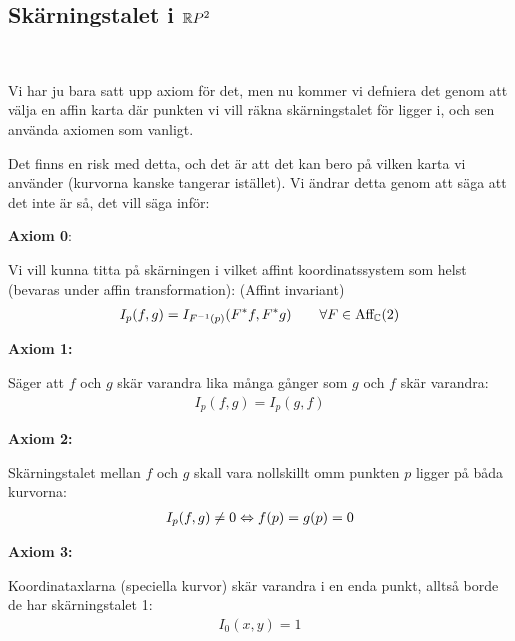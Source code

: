 \subsection{Skärningstalet i $\mathbb{R} P^2$}\hfill\\\par
\noindent Vi har ju bara satt upp axiom för det, men nu kommer vi defniera det genom att välja en affin karta där punkten vi vill räkna skärningstalet för ligger i, och sen använda axiomen som vanligt.\par
\noindent Det finns en risk med detta, och det är att det kan bero på vilken karta vi använder (kurvorna kanske tangerar istället). Vi ändrar detta genom att säga att det inte är så, det vill säga inför:
\par\bigskip
\noindent\textbf{Axiom 0}:\par
\noindent Vi vill kunna titta på skärningen i vilket affint koordinatssystem som helst (bevaras under affin transformation): (Affint invariant)
\begin{equation*}
  \begin{gathered}
    I_p(f,g) = I_{F^{-1}(p)}(F^*f,F^*g)\qquad\forall F\in\text{Aff}_{\mathbb{C}}(2)
  \end{gathered}
\end{equation*}
\par\bigskip
\noindent\textbf{Axiom 1:}\par
\noindent Säger att $f$ och $g$ skär varandra lika många gånger som $g$ och $f$ skär varandra:
\begin{equation*}
  \begin{gathered}
    I_p(f,g) = I_p(g,f)
  \end{gathered}
\end{equation*}
\par\bigskip
\noindent\textbf{Axiom 2:}\par
\noindent Skärningstalet mellan $f$ och $g$ skall vara nollskillt omm punkten $p$ ligger på båda kurvorna:
\begin{equation*}
  \begin{gathered}
    I_p(f,g)\neq0\Leftrightarrow f(p) = g(p) = 0
  \end{gathered}
\end{equation*}
\par\bigskip
\noindent\textbf{Axiom 3:}\par
\noindent Koordinataxlarna (speciella kurvor) skär varandra i en enda punkt, alltså borde de har skärningstalet 1:
\begin{equation*}
  \begin{gathered}
    I_0(x,y) = 1
  \end{gathered}
\end{equation*}
